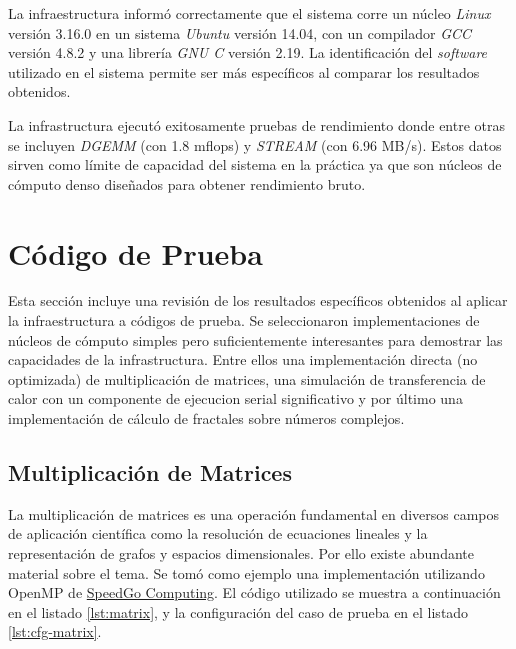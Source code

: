 \documentclass[a4paper]{report}
\begin{document}
La infraestructura informó correctamente que el sistema corre un núcleo {\it Linux} versión 3.16.0 en un sistema {\it Ubuntu} versión 14.04, con un compilador {\it GCC} versión 4.8.2 y una librería {\it GNU C} versión 2.19. La identificación del {\it software} utilizado en el sistema permite ser más específicos al comparar los resultados obtenidos.

\bigskip

La infrastructura ejecutó exitosamente pruebas de rendimiento donde entre otras se incluyen {\it DGEMM} (con 1.8 mflops) y {\it STREAM} (con 6.96 MB/s). Estos datos sirven como límite de capacidad del sistema en la práctica ya que son núcleos de cómputo denso diseñados para obtener rendimiento bruto.

\section{Código de Prueba}

Esta sección incluye una revisión de los resultados específicos obtenidos al aplicar la infraestructura a códigos de prueba. Se seleccionaron implementaciones de núcleos de cómputo simples pero suficientemente interesantes para demostrar las capacidades de la infrastructura. Entre ellos una implementación directa (no optimizada) de multiplicación de matrices, una simulación de transferencia de calor con un componente de ejecucion serial significativo y por último una implementación de cálculo de fractales sobre números complejos.

\subsection{Multiplicación de Matrices}

La multiplicación de matrices es una operación fundamental en diversos campos de aplicación científica como la resolución de ecuaciones lineales y la representación de grafos y espacios dimensionales. Por ello existe abundante material sobre el tema. Se tomó como ejemplo una implementación utilizando OpenMP de \href{http://blog.speedgocomputing.com/2010/08/parallelizing-matrix-multiplication.html}{SpeedGo Computing}. El código utilizado se muestra a continuación en el listado \ref{lst:matrix}, y la configuración del caso de prueba en el listado \ref{lst:cfg-matrix}.

\bigskip
\end{document}
